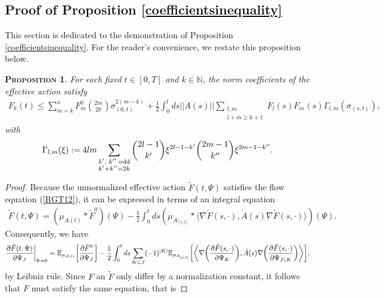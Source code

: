 \documentclass[12pt,twoside]{amsart}
\newcommand{\E}{{\mathbb{E}}}
\newcommand{\beq}{\begin{equation}}
\newcommand{\eeq}{\end{equation}}
\newtheorem{prop}{\textsc{Proposition}} [section]
\numberwithin{equation}{section}
\begin{document}
\begin{appendices}

\section{Proof of Proposition \ref{coefficientsinequality}}\label{proofofproposition}

This section is dedicated to the demonstration of Proposition \ref{coefficientsinequality}. For the reader's convenience, we restate this proposition below.

\begin{prop} For each fixed $t \in [0,T]$ and $k \in \mathbb{N}$, the norm coefficients of the effective action satisfy
\begin{eqnarray}
F_{k}(t) \le \sum_{m=k}^{n}F_{m}^{0}\binom{2m}{2k}\sigma_{(0,t)}^{2(m-k)}+\frac{1}{2}\int_{0}^{t}ds ||\dot{A}(s)|| \sum_{\substack{l,m \\ l+m \ge k+1}} F_{l}(s)F_{m}(s)\Gamma_{l,m}(\sigma_{(s,t)}), \nonumber
\end{eqnarray}
with
\begin{eqnarray}
\Gamma_{l,m}(\xi) := 4lm \sum_{\substack{\textup{$k'$, $k''$ odd} \\k'+k'' = 2k}}\binom{2l-1}{k'}\xi^{2l-1-k'}\binom{2m-1}{k''}\xi^{2m-1-k''}. \nonumber
\end{eqnarray}
\end{prop}
\begin{proof}
Because the unnormalized effective action $\tilde{F}(t,\Psi)$ satisfies the flow equation (\ref{RGT12}), it can be expressed in terms of an integral equation
\begin{eqnarray}
\tilde{F}(t,\Psi) = (\mu_{A(t)}*\tilde{F}^{0})(\Psi) - \frac{1}{2}\int_{0}^{t}ds (\mu_{A_{[s,t]}}*\langle \nabla \tilde{F}(s,\cdot), \dot{A}(s)\nabla \tilde{F}(s,\cdot)\rangle)(\Psi). \label{PRO1}
\end{eqnarray}
Consequently, we have
\beq
\frac{\partial \tilde{F}(t,\Psi)}{\partial \Psi_{J}}\bigg{|}_{\Psi = 0} = \E_{\mu_{A(t)}}\bigg{[}\frac{\partial \tilde{F}^{0}}{\partial \Psi_{J}}\bigg{]} -\frac{1}{2}\int_{0}^{t}ds \sum_{K\subset J}(-1)^{|K|}\E_{\mu_{A_{[s,t]}}}\bigg{[}\bigg{\langle} \nabla \bigg{(}\frac{\partial \tilde{F}(s,\cdot)}{\partial \Psi_{K}}\bigg{)},\dot{A}(s)\nabla \bigg{(}\frac{\partial \tilde{F}(s,\cdot)}{\partial \Psi_{J\setminus K}}\bigg{)}\bigg{\rangle}\bigg{]}, \label{PRO2}
\eeq
by Leibniz rule. Since $F$ an $\tilde{F}$ only differ by a normalization constant, it follows that $F$ must satisfy the same equation, that is

\end{proof}
\end{appendices}
\end{document}

